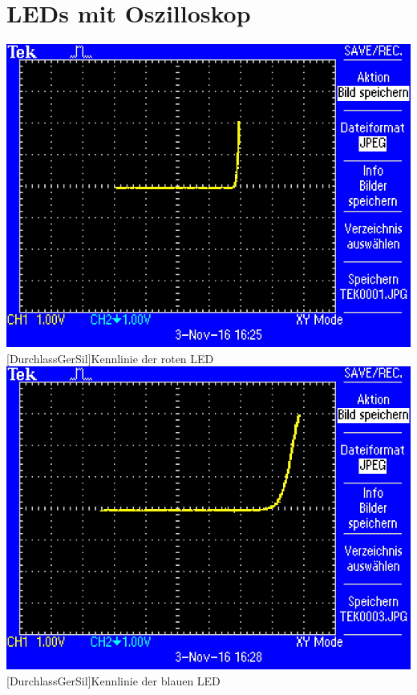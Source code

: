         \pagebreak
        
        \section{LEDs mit Oszilloskop}
        \begin{center}
        
         \includegraphics[scale=1]{Daten/TEK0001.JPG}
           [DurchlassGerSil]{Kennlinie der roten LED} 
         \includegraphics[scale=1]{Daten/TEK0003.JPG}
           [DurchlassGerSil]{Kennlinie der blauen LED} 
           \end{center}
        
